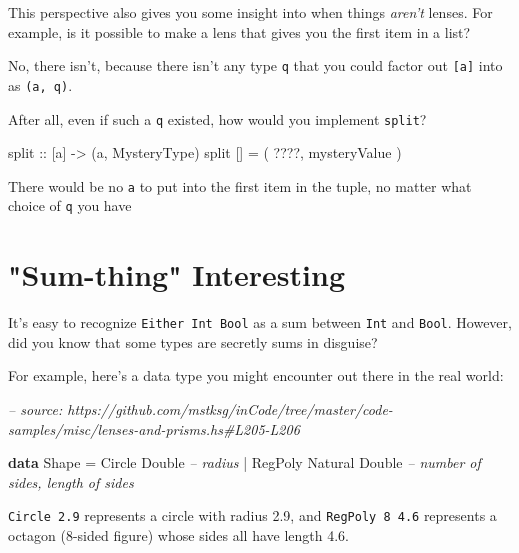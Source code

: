\documentclass[]{article}
\newenvironment{Shaded}{}{}
\newcommand{\CommentTok}[1]{\textcolor[rgb]{0.38,0.63,0.69}{\textit{#1}}}
\newcommand{\DataTypeTok}[1]{\textcolor[rgb]{0.56,0.13,0.00}{#1}}
\newcommand{\FunctionTok}[1]{\textcolor[rgb]{0.02,0.16,0.49}{#1}}
\newcommand{\KeywordTok}[1]{\textcolor[rgb]{0.00,0.44,0.13}{\textbf{#1}}}
\newcommand{\NormalTok}[1]{#1}
\newcommand{\OtherTok}[1]{\textcolor[rgb]{0.00,0.44,0.13}{#1}}
\begin{document}
This perspective also gives you some insight into when things \emph{aren't}
lenses. For example, is it possible to make a lens that gives you the first item
in a list?

No, there isn't, because there isn't any type \texttt{q} that you could factor
out \texttt{{[}a{]}} into as \texttt{(a,\ q)}.

After all, even if such a \texttt{q} existed, how would you implement
\texttt{split}?

\begin{Shaded}
\begin{Highlighting}[]
\OtherTok{split ::}\NormalTok{ [a] }\OtherTok{->}\NormalTok{ (a, }\DataTypeTok{MysteryType}\NormalTok{)}
\NormalTok{split [] }\FunctionTok{=}\NormalTok{ ( }\FunctionTok{????}\NormalTok{, mysteryValue )}
\end{Highlighting}
\end{Shaded}

There would be no \texttt{a} to put into the first item in the tuple, no matter
what choice of \texttt{q} you have

\hypertarget{sum-thing-interesting}{%
\section{"Sum-thing" Interesting}\label{sum-thing-interesting}}

It's easy to recognize \texttt{Either\ Int\ Bool} as a sum between \texttt{Int}
and \texttt{Bool}. However, did you know that some types are secretly sums in
disguise?

For example, here's a data type you might encounter out there in the real world:

\begin{Shaded}
\begin{Highlighting}[]
\CommentTok{-- source: https://github.com/mstksg/inCode/tree/master/code-samples/misc/lenses-and-prisms.hs#L205-L206}

\KeywordTok{data} \DataTypeTok{Shape} \FunctionTok{=} \DataTypeTok{Circle}  \DataTypeTok{Double}           \CommentTok{-- radius}
           \FunctionTok{|} \DataTypeTok{RegPoly} \DataTypeTok{Natural} \DataTypeTok{Double}   \CommentTok{-- number of sides, length of sides}
\end{Highlighting}
\end{Shaded}

\texttt{Circle\ 2.9} represents a circle with radius 2.9, and
\texttt{RegPoly\ 8\ 4.6} represents a octagon (8-sided figure) whose sides all
have length 4.6.
\end{document}
